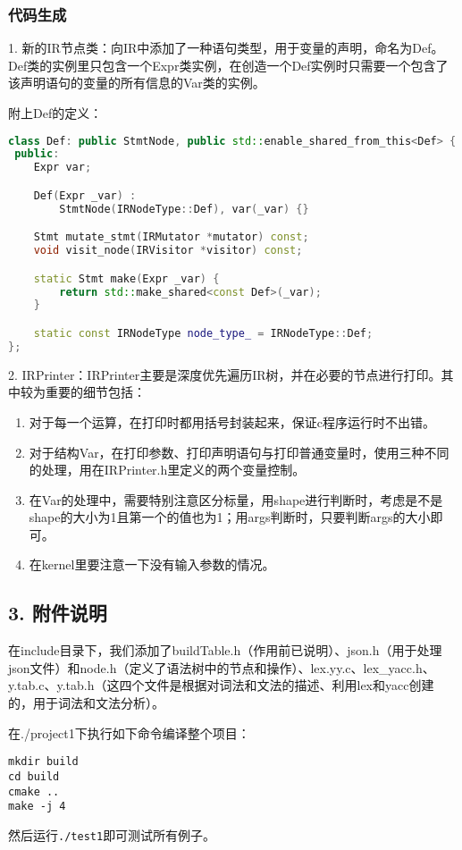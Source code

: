 \documentclass[a4paper,11pt]{ctexart}
\begin{document}
\subsubsection*{代码生成}

1. 新的IR节点类：向IR中添加了一种语句类型，用于变量的声明，命名为Def。Def类的实例里只包含一个Expr类实例，在创造一个Def实例时只需要一个包含了该声明语句的变量的所有信息的Var类的实例。

附上Def的定义：
\begin{lstlisting}[language=c++]
class Def: public StmtNode, public std::enable_shared_from_this<Def> {
 public:
    Expr var;

    Def(Expr _var) :
        StmtNode(IRNodeType::Def), var(_var) {}

    Stmt mutate_stmt(IRMutator *mutator) const;
    void visit_node(IRVisitor *visitor) const;

    static Stmt make(Expr _var) {
        return std::make_shared<const Def>(_var);
    }

    static const IRNodeType node_type_ = IRNodeType::Def;
};
\end{lstlisting}

2. IRPrinter：IRPrinter主要是深度优先遍历IR树，并在必要的节点进行打印。其中较为重要的细节包括：
\begin{enumerate}[1)]
\item 对于每一个运算，在打印时都用括号封装起来，保证c程序运行时不出错。
\item 对于结构Var，在打印参数、打印声明语句与打印普通变量时，使用三种不同的处理，用在IRPrinter.h里定义的两个变量控制。
\item 在Var的处理中，需要特别注意区分标量，用shape进行判断时，考虑是不是shape的大小为1且第一个的值也为1；用args判断时，只要判断args的大小即可。
\item 在kernel里要注意一下没有输入参数的情况。
\end{enumerate}
\subsection*{3. 附件说明}
\iffalse
我们添加了一些用于词法和语法分析的文件，包含在LexYacc目录下。它们的使用方法在LexYacc/ReadMe.txt中有说明。我们使用example1.l和example1.y中的词法和文法，即执行如下命令：
\begin{lstlisting}
yacc -d example1.y
lex example1.l
g++ -o example example.cc
./example
\end{lstlisting}
生成lex.yy.c、lex\_yacc.h、y.tab.c、y.tab.h这四个文件用于词法语法分析。我们将他们移动到了include目录下，以方便\#include。
\fi

在include目录下，我们添加了buildTable.h（作用前已说明）、json.h（用于处理json文件）和node.h（定义了语法树中的节点和操作）、lex.yy.c、lex\_yacc.h、y.tab.c、y.tab.h（这四个文件是根据对词法和文法的描述、利用lex和yacc创建的，用于词法和文法分析）。

在./project1下执行如下命令编译整个项目：
\begin{lstlisting}
mkdir build
cd build
cmake ..
make -j 4
\end{lstlisting}
然后运行\texttt{./test1}即可测试所有例子。
\end{document}
